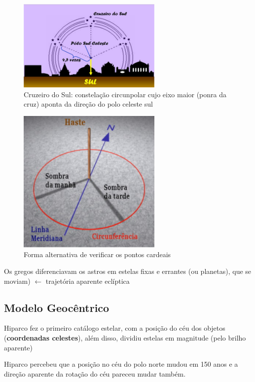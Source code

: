 \documentclass{article}
\begin{document}
\begin{figure}[H]
    \centering
    \includegraphics[width=7cm]{imagens/cruzeiro_sul.png}
    \caption{Cruzeiro do Sul: constelação circunpolar cujo eixo maior (ponra da cruz)
    aponta da direção do polo celeste sul}
\end{figure}



\begin{figure}[H]
    \centering
    \includegraphics[width=7cm]{imagens/cardeais.png}
    \caption{Forma alternativa de verificar os pontos cardeais}
\end{figure}

Os gregos diferenciavam os astros em estelas fixas e errantes (ou planetas), que se 
moviam) $\leftarrow$ trajetória aparente eclíptica

\subsection{Modelo Geocêntrico}

Hiparco fez o primeiro catálogo estelar, com a posição do céu dos 
objetos (\textbf{coordenadas celestes}), além disso, dividiu estelas 
em magnitude (pelo brilho aparente)

Hiparco percebeu que a posição no céu do polo norte mudou em 150 anos
e a direção aparente da rotação do céu pareceu mudar também.
\end{document}
